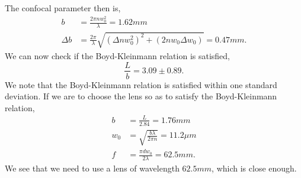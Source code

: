 The confocal parameter then is,
\begin{equation}
\begin{split}
    b &= \frac{2\pi n w_0^2}{\lambda} = 1.62mm \\
    \Delta b &= \frac{2\pi}{\lambda}\sqrt{(\Delta nw_0^2)^2 + (2nw_0\Delta w_0)} = 0.47mm.
\end{split}
\end{equation}
We can now check if the Boyd-Kleinmann relation is satisfied,
\begin{equation}
    \frac{L}{b} = 3.09 \pm 0.89.
\end{equation}
We note that the Boyd-Kleinmann relation is satisfied within one standard deviation. If we are to choose the lens so as to satisfy the Boyd-Kleinmann relation,
\begin{equation}
\begin{split}
    b &= \frac{L}{2.84} = 1.76mm \\
    w_0 &= \sqrt{\frac{b\lambda}{2\pi n}} = 11.2 \mu m \\
    f &= \frac{\pi d w_0}{2 \lambda} = 62.5 mm.
\end{split}
\end{equation}
We see that we need to use a lens of wavelength $62.5mm$, which is close enough.

